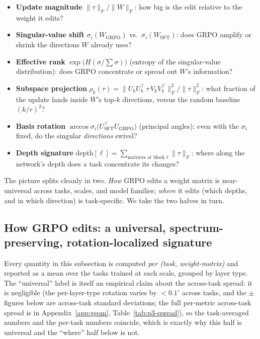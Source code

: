 \documentclass{article}
\newcommand{\tv}{\tau}
\newcommand{\Wsft}{W_{\mathrm{SFT}}}
\newcommand{\Wg}{W_{\mathrm{GRPO}}}
\newcommand{\dg}{^{\circ}}
\begin{document}
\begin{itemize}\itemsep2pt
\item \textbf{Update magnitude} $\|\tv\|_F/\|W\|_F$: how big is the edit relative to the weight it
edits?
\item \textbf{Singular-value shift} $\sigma_i(\Wg)$ vs.\ $\sigma_i(\Wsft)$: does GRPO amplify or
shrink the directions $W$ already uses?
\item \textbf{Effective rank} $\exp\!\big(H(\sigma/\!\sum\sigma)\big)$ (entropy of the singular-value
distribution): does GRPO concentrate or spread out $W$'s information?
\item \textbf{Subspace projection} $\rho_k(\tv)=\|U_kU_k^\top\,\tv\,V_kV_k^\top\|_F^2/\|\tv\|_F^2$:
what fraction of the update lands inside $W$'s top-$k$ directions, versus the random baseline
$(k/r)^2$?
\item \textbf{Basis rotation} $\arccos\sigma_i\!\big(U_{\mathrm{SFT}}^\top U_{\mathrm{GRPO}}\big)$
(principal angles): even with the $\sigma_i$ fixed, do the singular \emph{directions} swivel?
\item \textbf{Depth signature} $\mathrm{depth}[\ell]=\sum_{\text{matrices at block }\ell}\|\tv\|_F$:
where along the network's depth does a task concentrate its changes?
\end{itemize}

The picture splits cleanly in two. \emph{How} GRPO edits a weight matrix is near-universal across
tasks, scales, and model families; \emph{where} it edits (which depths, and in which direction) is task-specific. We take the two halves in turn.

\subsection{How GRPO edits: a universal, spectrum-preserving, rotation-localized signature}

Every quantity in this subsection is computed \emph{per (task, weight-matrix)} and reported as a mean
over the tasks trained at each scale, grouped by layer type. The ``universal'' label is itself an
empirical claim about the across-task spread: it is negligible (the per-layer-type rotation varies by
$<0.1\dg$ across tasks, and the $\pm$ figures below are across-task standard deviations; the full
per-metric across-task spread is in Appendix~\ref{app:geom}, Table~\ref{tab:p3-spread}), so the
task-averaged numbers and the per-task numbers coincide, which is exactly why this half is universal
and the ``where'' half below is not.
\end{document}
